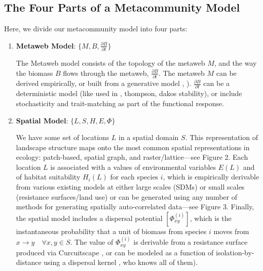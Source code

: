 \documentclass[]{article}
\begin{document}
\hypertarget{the-four-parts-of-a-metacommunity-model}{%
\subsection{The Four Parts of a Metacommunity
Model}\label{the-four-parts-of-a-metacommunity-model}}

Here, we divide our metacommunity model into four parts:

\begin{enumerate}
\def\labelenumi{\arabic{enumi}.}
\item
  \textbf{Metaweb Model}: \(\{M, B, \frac{\partial B}{\partial t}\}\)

  The Metaweb model consists of the topology of the metaweb \(M\), and
  the way the biomass \(B\) flows through the metaweb,
  \(\frac{\partial B}{\partial t}\). The metaweb \(M\) can be derived
  empirically, or built from a generative model
  \citep{williams_martinez}, \citep{allesina}).
  \(\frac{\partial B}{\partial t}\) can be a deterministic model (like
  used in \citep{delmas}, thompson, dakos stability), or include
  stochasticity and trait-matching as part of the functional response.
\item
  \textbf{Spatial Model}: \(\{L, S, H, E, \Phi \}\)

  We have some set of locations \(L\) in a spatial domain \(S\). This
  representation of landscape structure maps onto the most common
  spatial representations in ecology: patch-based, spatial graph, and
  raster/lattice---see Figure 2. Each location \(L\) is associated with
  a values of environmental variables \(E(L)\) and of habitat
  suitability \(H_i(L)\) for each species \(i\), which is empirically
  derivable from various existing models at either large scales (SDMs)
  or small scales (resistance surfaces/land use) or can be generated
  using any number of methods for generating spatially auto-correlated
  data---see Figure 3. Finally, the spatial model includes a dispersal
  potential \([\Phi^{(i)}_{xy}]\), which is the instantaneous\renewcommand*{\arraystretch}{1.4}
  probability that a unit of biomass from species \(i\) moves from
  \(x \to y \quad \forall x,y \in S\). The value of \(\Phi^{(i)}_{xy}\)
  is derivable from a resistance surface produced via Curcuitscape
  \citep{cite}, or can be modeled as a function of
  isolation-by-distance using a dispersal kernel \citep{hanski}, who
  knows all of them).


\end{enumerate}
\end{document}
